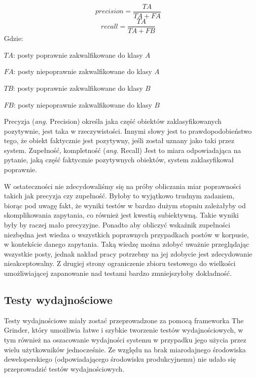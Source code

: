 \documentclass[runningheads]{llncs}
\begin{document}
\begin{equation}
	precision = \frac{TA}{TA + FA}
\end{equation}
\begin{equation}
	recall = \frac{TA}{TA + FB}
\end{equation}
Gdzie: 

	$TA$: posty poprawnie zakwalfikowane do klasy $A$
	
	$FA$: posty niepoprawnie zakwalfikowane do klasy $A$
	
	$TB$: posty poprawnie zakwalfikowane do klasy $B$
	
	$FB$: posty niepoprawnie zakwalfikowane do klasy $B$
	
Precyzja (\textit{ang.} Precision)  określa jaka część obiektów
zaklasyfikowanych pozytywnie, jest taka  w rzeczywistości. Innymi słowy jest to
prawdopodobieństwo tego, że obiekt faktycznie jest  pozytywny, jeśli został
uznany jako taki przez system.
Zupełność, kompletność (\textit{ang.} Recall) Jest to miara odpowiadająca na
pytanie, jaką część faktycznie pozytywnych obiektów, system zaklasyfikował poprawnie.

W ostateczności nie zdecydowaliśmy się na próby  obliczania miar poprawności
takich jak precyzja czy zupełność. Byłoby to  wyjątkowo trudnym zadaniem, biorąc
pod uwagę fakt, że wyniki testów w bardzo dużym  stopniu zależałyby od
skomplikowania zapytania, co również jest kwestią  subiektywną. Takie wyniki
były by raczej mało precyzyjne. Ponadto aby obliczyć  wskaźnik zupełności
niezbędna jest wiedza o wszystkich poprawnych przypadkach  postów w korpusie, w
kontekście danego zapytania. Taką wiedzę można zdobyć  uważnie przeglądając
wszystkie posty, jednak nakład pracy potrzebny na jej  zdobycie jest
zdecydowanie nieakceptowalny. Z drugiej strony  ograniczenie zbioru testowego do
wielkości umożliwiającej zapanowanie nad testami bardzo zmniejszyłoby
dokładność.

 

\subsection{Testy wydajnościowe}
Testy wydajnościowe miały zostać przeprowadzone  za pomocą frameworka The
Grinder, który 
umożliwia łatwe i szybkie  tworzenie  testów wydajnościowych, w tym również
na oszacowanie wydajności systemu w przypadku  jego użycia przez wielu
użytkowników jednocześnie. Ze względu na brak miarodajnego środowiska
deweloperskiego (odpowiadającego środowisku produkcyjnemu) nie udało się
przeprowadzić testów wydajnościowych.

\clearpage
 
\end{document}
